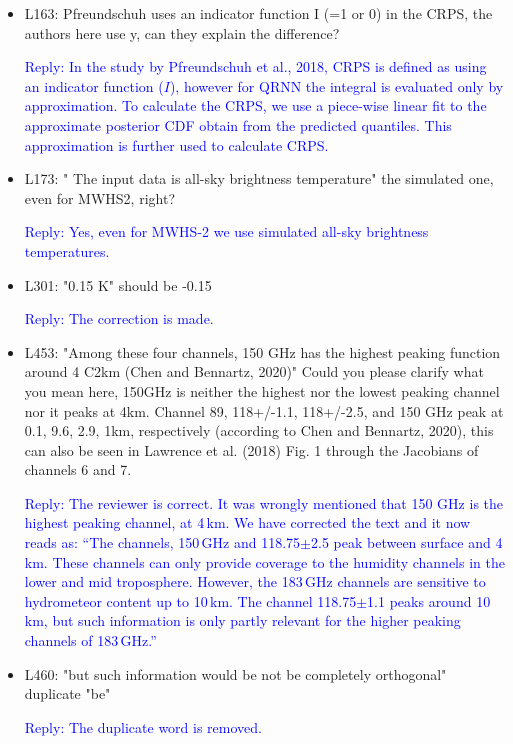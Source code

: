 \documentclass[11pt,a4paper,draft]{article}
\begin{document}
\begin{itemize}
		
\item	
		L163: Pfreundschuh uses an indicator function I (=1 or 0) in the CRPS, the authors
		here use y, can they explain the difference?
		
\textcolor{blue}{Reply: In the study by Pfreundschuh et al., 2018, CRPS is defined as using an indicator function ($I$), however for QRNN the integral is evaluated only by approximation. To calculate the CRPS, we use a piece-wise linear fit to the approximate posterior CDF obtain from the predicted quantiles. This approximation is further used to calculate CRPS. }
		
		
\item	
		L173: " The input data is all-sky brightness temperature" the simulated one, even for
		MWHS2, right?
		
\textcolor{blue}{Reply: Yes, even for MWHS-2 we use simulated all-sky brightness temperatures.}
		
		
\item	L301: "0.15 K" should be -0.15
		
\textcolor{blue}{Reply: The correction is made.} 
		
		
	
\item	
		L453: "Among these four channels, 150 GHz has the highest peaking function around 4
		C2km (Chen and Bennartz, 2020)" Could you please clarify what you mean here, 150GHz
		is neither the highest nor the lowest peaking channel nor it peaks at 4km. Channel 89,
		118+/-1.1, 118+/-2.5, and 150 GHz peak at 0.1, 9.6, 2.9, 1km, respectively (according
		to Chen and Bennartz, 2020), this can also be seen in Lawrence et al. (2018) Fig. 1
		through the Jacobians of channels 6 and 7.
	
\textcolor{blue}{Reply: The reviewer is correct. It was wrongly mentioned that 150 GHz is the highest peaking channel, at 4\,km. We have corrected the text and it now reads as:	
``The channels, 150\,GHz and 118.75$\pm$2.5 peak between surface and 4\,km. These channels can only provide coverage to the humidity channels in the lower and mid troposphere. However, the 183\,GHz channels are sensitive to hydrometeor content up to 10\,km. The channel 118.75$\pm$1.1 peaks around 10\,km, but such information is only partly relevant for the higher peaking channels of 183\,GHz.'' }

		
\item	L460: "but such information would be not be completely orthogonal" duplicate "be"
		
\textcolor{blue}{Reply: The duplicate word is removed. }
		

\end{itemize}
\end{document}
